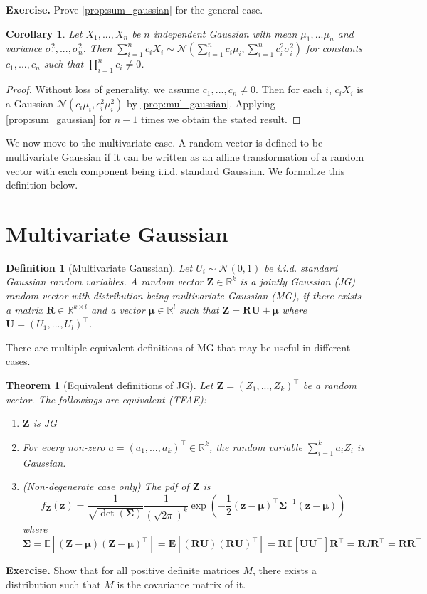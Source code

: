 \documentclass{article}
\newtheorem{theorem}{Theorem}
\newtheorem{corollary}{Corollary}
\newtheorem{definition}{Definition}
\newcommand{\R}{\mathbb{R}}
\DeclareMathOperator*{\1}{\mathbbm{1}}
\newcommand{\E}{\mathbb E}
\renewcommand{\b}[1]{\mathbf{#1}}
\newcommand{\cN}{\mathcal{N}}
\theoremstyle{definition}
\theoremstyle{remark}
\newcommand{\bSig}{\mathbf{\Sigma}}
\begin{document}
  \textbf{Exercise.} Prove  \cref{prop:sum_gaussian} for the general case.
  \begin{corollary}
    Let $X_1,...,X_n$ be $n$ independent Gaussian with mean $\mu_1,...\mu_n$ and variance $\sigma_1^2,...,\sigma_n^2$. Then $\sum_{i=1}^n c_iX_i\sim \cN(\sum_{i=1}^n c_i\mu_i, \sum_{i=1}^n c_i^2\sigma_i^2)$ for constants $c_1,...,c_n$ such that $\prod_{i=1}^n c_i\neq 0$.
  \end{corollary}
  \begin{proof}
    Without loss of generality, we assume $c_1,...,c_n\neq 0$. Then for each $i$, $c_iX_i$ is a Gaussian $\cN(c_i\mu_i, c_i^2\mu_i^2)$ by \cref{prop:mul_gaussian}. Applying \cref{prop:sum_gaussian} for  $n-1$ times we obtain the stated result.
  \end{proof}
  We now move to the multivariate case. A random vector is defined to be multivariate Gaussian if it can be written as an affine transformation of a random vector with each component being i.i.d. standard Gaussian. We formalize this definition below.
  \section{Multivariate Gaussian}
  \begin{definition}[Multivariate Gaussian]
    Let $U_i\sim \cN(0,1)$ be i.i.d. standard Gaussian random variables. A random vector $\b Z\in \mathbb R^k$ is a jointly Gaussian (JG) random vector with distribution being multivariate Gaussian (MG), if there exists a matrix $\b R\in \R^{k\times l}$ and a vector $\b\mu \in \R^l$ such that $\b Z=\b R\b U+\b \mu$ where $\b U=(U_1,...,U_l)^\top$.
  \end{definition}
  There are multiple equivalent definitions of MG that may be useful in different cases.
  \begin{theorem}[Equivalent definitions of JG]
    Let $\b Z=(Z_1,...,Z_k)^\top$ be a random vector. The followings are equivalent (TFAE):
    \begin{enumerate}
      \item $\b Z$ is JG 
      \item For every non-zero $a=(a_1,...,a_k)^\top\in \R^k$, the random variable $\sum_{i=1}^k a_iZ_i$ is Gaussian.
      \item (Non-degenerate case only) The pdf of $\b Z$ is \[f_{\b Z}(\b z)=\frac{1}{\sqrt{\det(\bSig)}}\frac{1}{(\sqrt{2\pi})^k}\exp\left(-\frac{1}{2}(\b z-\b \mu)^\top\bSig^{-1}(\b z-\b \mu)\right)\]
      where $\bSig=\E[(\b Z-\b \mu)(\b Z-\b \mu)^\top]=\b E[(\b R\b U)(\b R\b U)^\top]=\b R\E[\b U\b U^\top]\b R^\top=\b RI\b R^\top=\b R\b R^\top$
    \end{enumerate}
  \end{theorem}
  \textbf{Exercise.} Show that for all positive definite matrices $M$, there exists a distribution such that $M$ is the covariance matrix of it.
\end{document}
